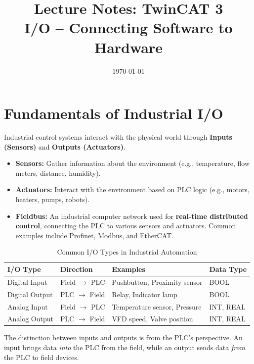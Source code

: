 \documentclass[11pt,a4paper]{article}
\title{
    \vspace{-1cm}
    \textbf{Lecture Notes: TwinCAT 3}\\
    \Large I/O -- Connecting Software to Hardware
}
\author{}
\date{\today}
\begin{document}
\maketitle

\tableofcontents
\newpage

\section{Fundamentals of Industrial I/O}

Industrial control systems interact with the physical world through \textbf{Inputs (Sensors)} and \textbf{Outputs (Actuators)}.

\begin{itemize}[leftmargin=*]
    \item \textbf{Sensors:} Gather information about the environment (e.g., temperature, flow meters, distance, humidity).
    \item \textbf{Actuators:} Interact with the environment based on PLC logic (e.g., motors, heaters, pumps, robots).
    \item \textbf{Fieldbus:} An industrial computer network used for \textbf{real-time distributed control}, connecting the PLC to various sensors and actuators. Common examples include Profinet, Modbus, and EtherCAT.
\end{itemize}

\begin{table}[h]
\centering
\begin{tabular}{@{}llll@{}}
\toprule
\textbf{I/O Type} & \textbf{Direction} & \textbf{Examples} & \textbf{Data Type} \\
\midrule
Digital Input & Field $\rightarrow$ PLC & Pushbutton, Proximity sensor & BOOL \\
Digital Output & PLC $\rightarrow$ Field & Relay, Indicator lamp & BOOL \\
Analog Input & Field $\rightarrow$ PLC & Temperature sensor, Pressure & INT, REAL \\
Analog Output & PLC $\rightarrow$ Field & VFD speed, Valve position & INT, REAL \\
\bottomrule
\end{tabular}
\caption{Common I/O Types in Industrial Automation}
\end{table}

\begin{notebox}
The distinction between inputs and outputs is from the PLC's perspective. An input brings data \textit{into} the PLC from the field, while an output sends data \textit{from} the PLC to field devices.
\end{notebox}
\end{document}
